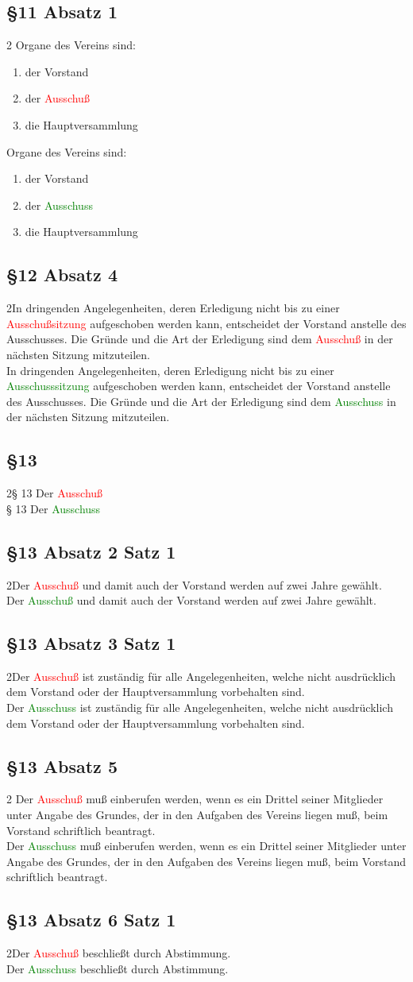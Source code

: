 \documentclass[10pt,a4paper,parskip=half]{scrartcl}
\newcommand{\new}[1]{\textcolor{Green}{#1}}
\newcommand{\old}[1]{\textcolor{Red}{#1}}
\newcommand{\compare}[3]{\subsection*{#1}\begin{multicols}{2}#2\columnbreak\\#3\end{multicols}}
\begin{document}
  \subsection*{§11 Absatz 1}\begin{multicols}{2}
    Organe des Vereins sind:
    \begin{enumerate}[noitemsep]
      \item der Vorstand
      \item der \old{Ausschuß}
      \item die Hauptversammlung
    \end{enumerate}
    \columnbreak
    Organe des Vereins sind:
    \begin{enumerate}[noitemsep]
      \item der Vorstand
      \item der \new{Ausschuss}
      \item die Hauptversammlung
    \end{enumerate}
    \end{multicols}

  \compare{§12 Absatz 4}
  {In dringenden Angelegenheiten,
    deren Erledigung nicht bis zu einer \old{Ausschußsitzung} aufgeschoben werden kann,
    entscheidet der Vorstand anstelle des Ausschusses.
    Die Gründe und die Art der Erledigung sind dem \old{Ausschuß} in der nächsten Sitzung mitzuteilen.
  }{
    In dringenden Angelegenheiten,
    deren Erledigung nicht bis zu einer \new{Ausschusssitzung} aufgeschoben werden kann,
    entscheidet der Vorstand anstelle des Ausschusses.
    Die Gründe und die Art der Erledigung sind dem \new{Ausschuss} in der nächsten Sitzung mitzuteilen.
  }

  \compare{§13}
  {§ 13 Der \old{Ausschuß}}
  {§ 13 Der \new{Ausschuss}}

  \compare{§13 Absatz 2 Satz 1}
  {Der \old{Ausschuß} und damit auch der Vorstand werden auf zwei Jahre gewählt.}
  {Der \new{Ausschuß} und damit auch der Vorstand werden auf zwei Jahre gewählt.}

  \compare{§13 Absatz 3 Satz 1}
  {Der \old{Ausschuß} ist zuständig für alle Angelegenheiten, welche nicht ausdrücklich dem Vorstand oder der Hauptversammlung vorbehalten sind.}
  {Der \new{Ausschuss} ist zuständig für alle Angelegenheiten, welche nicht ausdrücklich dem Vorstand oder der Hauptversammlung vorbehalten sind.}

  \compare{§13 Absatz 5}{    
  Der \old{Ausschuß} muß einberufen werden,
    wenn es ein Drittel seiner Mitglieder unter Angabe des Grundes,
    der in den Aufgaben des Vereins liegen muß,
    beim Vorstand schriftlich beantragt.
  }
  {Der \new{Ausschuss} muß einberufen werden,
  wenn es ein Drittel seiner Mitglieder unter Angabe des Grundes,
  der in den Aufgaben des Vereins liegen muß,
  beim Vorstand schriftlich beantragt.}
  \compare{§13 Absatz 6 Satz 1}
  {Der \old{Ausschuß} beschließt durch Abstimmung.}
  {Der \new{Ausschuss} beschließt durch Abstimmung.}
\end{document}
